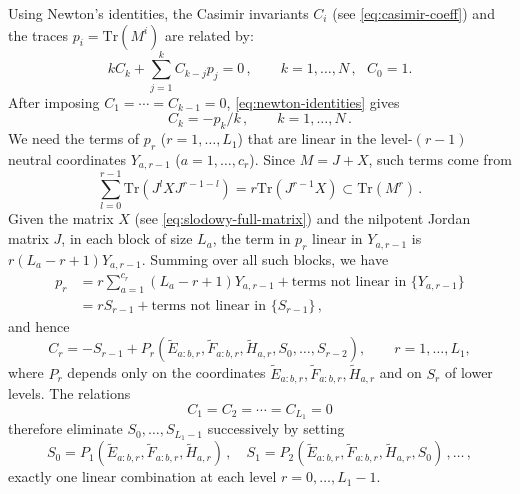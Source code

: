 \documentclass[12pt,a4paper]{article}
\begin{document}
Using Newton's identities, the Casimir invariants $C_i$ 
(see \eqref{eq:casimir-coeff}) and the traces $p_i=\text{Tr}(M^i)$ are related by:
\begin{equation}
 kC_k+\sum_{j=1}^{k}C_{k-j}p_j=0\,, \qquad k=1,\dots,N\,,\ \ \ C_0=1.
 \label{eq:newton-identities}
\end{equation}
After imposing $C_1=\cdots=C_{k-1}=0$, 
\eqref{eq:newton-identities} gives 
\begin{equation}
    C_k=-p_k/k\,,\qquad k=1,\dots,N\,. 
\end{equation}
We need the terms of $p_r$ ($r=1,\dots,L_1$) that are linear in the level-$(r-1)$ neutral coordinates $Y_{a,r-1}$ ($a=1,\dots,c_r$). Since $M=J+X$, such terms come from
\begin{equation}
    \sum_{l=0}^{r-1}\text{Tr}(J^l X J^{r-1-l})=r \text{Tr}(J^{r-1} X )\subset \text{Tr}(M^r)\,.
\end{equation}
Given the matrix $X$ (see \eqref{eq:slodowy-full-matrix}) and the nilpotent Jordan matrix $J$, in each block of size
$L_a$, the term in $p_r$ linear in $Y_{a,r-1}$ is
$r(L_a-r+1)Y_{a,r-1}$. Summing over all such blocks, we have
\begin{equation}
\begin{aligned}
    p_r&=r\sum_{a=1}^{c_r} (L_a-r+1)Y_{a,r-1}+\text{terms not linear in }\{Y_{a,r-1}\}\\
    &=rS_{r-1}+\text{terms not linear in }\{S_{r-1}\}\,,
\end{aligned}
\end{equation}
and hence
\begin{equation}
 C_r=-S_{r-1}+P_r(\tilde{E}_{a:b,r},\tilde{F}_{a:b,r},\tilde{H}_{a,r},S_0,\dots,S_{r-2}),
 \qquad r=1,\ldots,L_1,
 \label{eq:triangular-casimir}
\end{equation}
where $P_r$ depends only on the coordinates $\tilde{E}_{a:b,r},\tilde{F}_{a:b,r},\tilde{H}_{a,r}$ and on $S_r$ of lower levels.  The relations
\begin{equation}
 C_1=C_2=\cdots=C_{L_1}=0
 \label{eq:low-casimir-elimination}
\end{equation}
therefore eliminate $S_0,\ldots,S_{L_1-1}$ successively by setting
\begin{equation}
    S_0=P_1(\tilde{E}_{a:b,r},\tilde{F}_{a:b,r},\tilde{H}_{a,r})\,,\quad S_1=P_2(\tilde{E}_{a:b,r},\tilde{F}_{a:b,r},\tilde{H}_{a,r},S_0)\,,\dots \,,
\end{equation}
exactly one linear combination
at each level $r=0,\dots,L_1-1$. 



 



\end{document}

